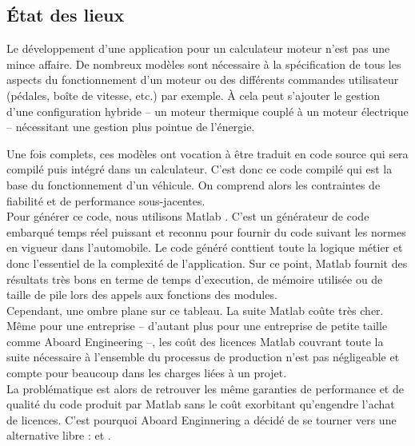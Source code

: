 \subsection{État des lieux}
Le développement d'une application pour un calculateur moteur n'est pas une
mince affaire. De nombreux modèles sont nécessaire à la spécification de tous
les aspects du fonctionnement d'un moteur ou des différents commandes
utilisateur (pédales, boîte de vitesse, etc.) par exemple. À cela peut s'ajouter
le gestion d'une configuration hybride -- un moteur thermique couplé à un moteur
électrique -- nécessitant une gestion plus pointue de l'énergie.

Une fois complets, ces modèles ont vocation à être traduit en code source qui
sera compilé puis intégré dans un calculateur. C'est donc ce code compilé qui
est la base du fonctionnement d'un véhicule. On comprend alors les contraintes
de fiabilité et de performance sous-jacentes.\\

Pour générer ce code, nous utilisons Matlab\up{\circledR} . C'est un
générateur de code embarqué temps réel puissant et reconnu pour fournir du code
suivant les normes en vigueur dans l'automobile.
Le code généré conttient toute la logique métier et donc l'essentiel de la
complexité de l'application. Sur ce point, Matlab\up{\circledR} 
fournit des résultats très bons en terme de temps d'execution, de mémoire
utilisée ou de taille de pile lors des appels aux fonctions des modules.\\

Cependant, une ombre plane sur ce tableau. La suite Matlab\up{\circledR} coûte
très cher. Même pour une entreprise -- d'autant plus pour une entreprise de
petite taille comme Aboard Engineering --, les coût des licences
Matlab\up{\circledR} couvrant toute la suite nécessaire à l'ensemble du
processus de production n'est pas négligeable et compte pour beaucoup dans les
charges liées à un projet.\\

La problématique est alors de retrouver les même garanties de performance et de
qualité du code produit par Matlab\up{\circledR} sans le coût exorbitant
qu'engendre l'achat de licences. C'est pourquoi Aboard Enginnering a décidé de
se tourner vers une alternative libre :  et .

